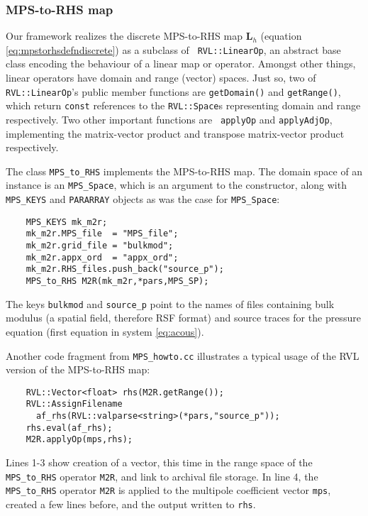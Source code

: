 \subsubsection{MPS-to-RHS map}

Our framework realizes the discrete MPS-to-RHS map $\mathbf L_h$ (equation
\ref{eq:mpstorhsdefndiscrete}) as a subclass of {\tt
  RVL::LinearOp}, an abstract base class encoding the behaviour of a linear map or
operator. Amongst other things, linear operators have domain and range
(vector) spaces. Just so, two of {\tt RVL::LinearOp}'s public member
functions are {\tt getDomain()} and {\tt getRange()}, which return
{\tt const} references to the {\tt RVL::Space}s representing domain
and range respectively. Two other important functions are {\tt
  applyOp} and {\tt applyAdjOp}, implementing the matrix-vector
product and transpose matrix-vector product respectively. 

The class {\tt MPS\_to\_RHS} implements the MPS-to-RHS map. The domain
space of an instance is an {\tt MPS\_Space}, which is an argument to
the constructor, along with {\tt MPS\_KEYS} and {\tt PARARRAY} objects
as was the case for {\tt MPS\_Space}:
{\small
\begin{verbatim}
    MPS_KEYS mk_m2r;
    mk_m2r.MPS_file  = "MPS_file"; 
    mk_m2r.grid_file = "bulkmod";  
    mk_m2r.appx_ord  = "appx_ord"; 
    mk_m2r.RHS_files.push_back("source_p");
    MPS_to_RHS M2R(mk_m2r,*pars,MPS_SP);
\end{verbatim}
}
The keys {\tt bulkmod} and {\tt source\_p} point to the names of files
containing bulk modulus (a spatial field, therefore RSF format) and
source traces for the pressure equation (first equation in system
\ref{eq:acous}).

Another code fragment from {\tt MPS\_howto.cc} illustrates a typical usage
of the RVL version of the MPS-to-RHS map:
{\small
\begin{verbatim}
    RVL::Vector<float> rhs(M2R.getRange());
    RVL::AssignFilename
      af_rhs(RVL::valparse<string>(*pars,"source_p"));
    rhs.eval(af_rhs);
    M2R.applyOp(mps,rhs);
\end{verbatim}
}
Lines 1-3 show creation of a vector, this time in the range space of
the {\tt MPS\_to\_RHS} operator {\tt M2R}, and link to archival file storage.
In line 4, the {\tt MPS\_to\_RHS} operator {\tt M2R} is applied to the
multipole coefficient vector {\tt mps}, created a few lines before, and the
output written to {\tt rhs}.

